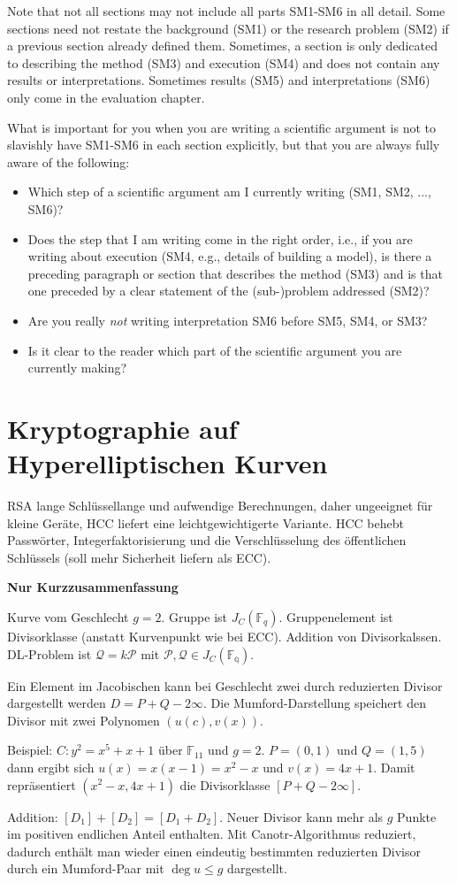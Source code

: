 Note that not all sections may not include all parts SM1-SM6 in all detail.
Some sections need not restate the background (SM1) or the research problem (SM2) if a previous section already defined them.
Sometimes, a section is only dedicated to describing the method (SM3) and execution (SM4) and does not contain any results or interpretations.
Sometimes results (SM5) and interpretations (SM6) only come in the evaluation chapter.

What is important for you when you are writing a scientific argument is not to slavishly have SM1-SM6 in each section explicitly, but that you are always fully aware of the following:
%
\begin{itemize}
  \item Which step of a scientific argument am I currently writing (SM1, SM2, ..., SM6)?
  \item Does the step that I am writing come in the right order, i.e., if you are writing about execution (SM4, e.g., details of building a model), is there a preceding paragraph or section that describes the method (SM3) and is that one preceded by a clear statement of the (sub-)problem addressed (SM2)?
  \item Are you really \emph{not} writing interpretation SM6 before SM5, SM4, or SM3?
  \item Is it clear to the reader which part of the scientific argument you are currently making?
\end{itemize}




\section{Kryptographie auf Hyperelliptischen Kurven}

RSA lange Schlüssellange und aufwendige Berechnungen, daher ungeeignet für kleine Geräte, HCC liefert eine leichtgewichtigerte Variante. HCC behebt Passwörter, Integerfaktorisierung und die Verschlüsselung des öffentlichen Schlüssels (soll mehr Sicherheit liefern als ECC).

\cite[59--60]{Salam21}


\textbf{Nur Kurzzusammenfassung}

Kurve vom Geschlecht $g=2$. Gruppe ist $J_C(\mathbb{F}_q)$. Gruppenelement ist Divisorklasse (anstatt Kurvenpunkt wie bei ECC). Addition von Divisorkalssen. DL-Problem ist $\mathcal{Q}=k\mathcal{P}$ mit $\mathcal{P},\mathcal{Q}\in J_C(\mathbb{F_q})$.

Ein Element im Jacobischen kann bei Geschlecht zwei durch reduzierten Divisor dargestellt werden $D=P+Q-2\infty$. Die Mumford-Darstellung speichert den Divisor mit zwei Polynomen $(u(c),v(x))$.

Beispiel: $C:y^2=x^5+x+1$ über $\mathbb{F}_{11}$ und $g=2$. $P=(0,1)$ und $Q=(1,5)$ dann ergibt sich $u(x)=x(x-1)=x^2-x$ und $v(x)=4x+1$. Damit repräsentiert $(x^2-x,4x+1)$ die Divisorklasse $[P+Q-2\infty]$.

Addition: \([D_1]+[D_2]=[D_1+D_2]\). Neuer Divisor kann mehr als $g$ Punkte im positiven endlichen Anteil enthalten. Mit Canotr-Algorithmus reduziert, dadurch enthält man wieder einen eindeutig bestimmten reduzierten Divisor durch ein Mumford-Paar mit $\deg u\leq g$ dargestellt.

